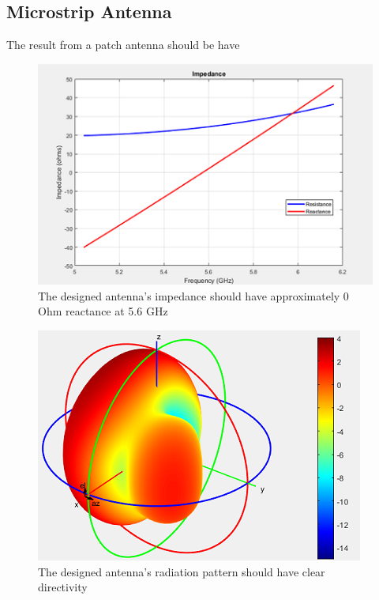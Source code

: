\documentclass[11pt,a4paper]{article}
\begin{document}
    
    
    \subsection{Microstrip Antenna}
      \indent The result from a patch antenna should be have 
      \begin{figure}[ht]
        \includegraphics{Impedance.png}
        \centering
        \caption{The designed antenna's impedance should have approximately 0 Ohm reactance at 5.6 GHz}
      \end{figure}

      \begin{figure}[ht]
        \includegraphics{Radiation_pattern}
        \centering
        \caption{The designed antenna's radiation pattern should have clear directivity}
      \end{figure}

  \pagebreak
\end{document}
